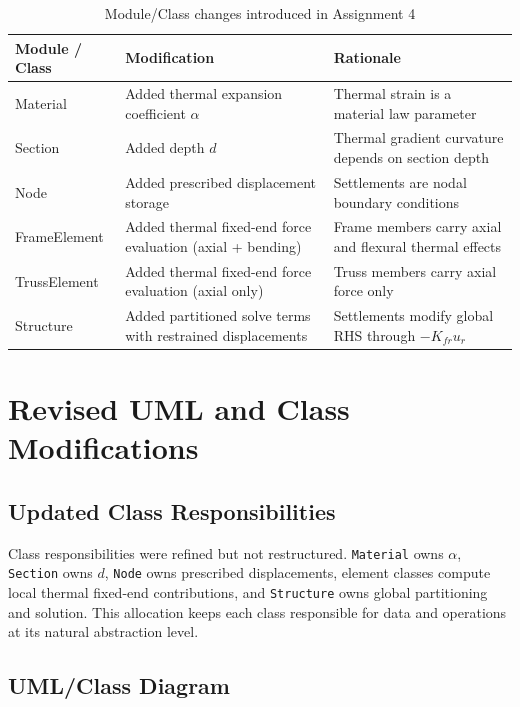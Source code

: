 \begin{table}[H]
    \centering
    \caption{Module/Class changes introduced in Assignment 4}
    \label{tab:module_change_table}
    \renewcommand{\arraystretch}{1.25}
    \setlength{\tabcolsep}{4pt}
    \begin{tabular}{p{}p{}p{}}
        \toprule
        Module / Class & Modification & Rationale \\
        \midrule
        Material & Added thermal expansion coefficient $\alpha$ & Thermal strain is a material law parameter \\
        Section & Added depth $d$ & Thermal gradient curvature depends on section depth \\
        Node & Added prescribed displacement storage & Settlements are nodal boundary conditions \\
        FrameElement & Added thermal fixed-end force evaluation (axial + bending) & Frame members carry axial and flexural thermal effects \\
        TrussElement & Added thermal fixed-end force evaluation (axial only) & Truss members carry axial force only \\
        Structure & Added partitioned solve terms with restrained displacements & Settlements modify global RHS through $-K_{fr}u_r$ \\
        \bottomrule
    \end{tabular}
    \renewcommand{\arraystretch}{1.0}
    \setlength{\tabcolsep}{6pt}
\end{table}

\pagebreak
\section{Revised UML and Class Modifications}

\subsection{Updated Class Responsibilities}

Class responsibilities were refined but not restructured. \texttt{Material} owns $\alpha$, \texttt{Section} owns $d$, \texttt{Node} owns prescribed displacements, element classes compute local thermal fixed-end contributions, and \texttt{Structure} owns global partitioning and solution. This allocation keeps each class responsible for data and operations at its natural abstraction level.

\subsection{UML/Class Diagram}

